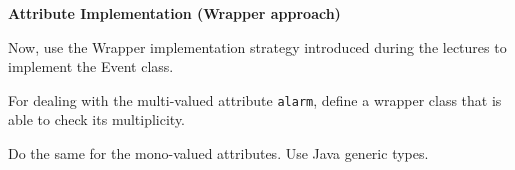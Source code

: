 \documentclass[a4paper,11pt]{memoir}
\newcommand{\code}[1]{\lstinline{#1}}
\begin{document}
	
\begin{exercise}
	\textbf{Attribute Implementation (Wrapper approach)}
	
Now, use the Wrapper implementation strategy introduced during the lectures to implement the Event class.
	\begin{inparaenum}
		\item For dealing with the multi-valued attribute \code{alarm}, define a wrapper class that is able to check its multiplicity.
		\item Do the same for the mono-valued attributes. Use Java generic types.
	\end{inparaenum}
\end{exercise}
\begin{solution}
	
	
	
	
\end{solution}
\end{document}
